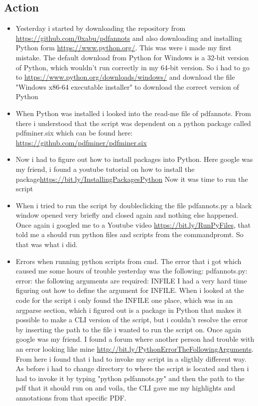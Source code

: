 \documentclass{article}
\begin{document}
\subsection{Action}
\begin{itemize}
    \item Yesterday i started by downloading the repository from \url{https://github.com/0xabu/pdfannots} and also downloading and installing Python form \url{https://www.python.org/}. This was were i made my first mistake. The default download from Python for Windows is a 32-bit version of Python, which wouldn't run correctly in my 64-bit version. So i had to go to \url{https://www.python.org/downloads/windows/} and download the file  "Windows x86-64 executable installer" to download the correct version of Python
    \item When Python was installed i looked into the read-me file of pdfannots. From there i understood that the script was dependent on a python package called pdfminer.six which can be found here: \url{https://github.com/pdfminer/pdfminer.six}
    \item Now i had to figure out how to install packages into Python. Here google was my friend, i found a youtube tutorial on how to install the package\url{https://bit.ly/InstallingPackagesPython} Now it was time to run the script
    \item When i tried to run the script by doubleclicking the file pdfannots.py a black window opened very briefly and closed again and nothing else happened. Once again i googled me to a Youtube video \url{https://bit.ly/RunPyFiles}, that told me a should run python files and scripts from the commandpromt. So that was what i did. 
    \item Errors when running python scripts from cmd. The error that i got which caused me some hours of trouble yesterday was the following: pdfannots.py: error: the following arguments are required: INFILE
    I had a very hard time figuring out how to  define the argument for INFILE. When i looked at the code for the script i only found the INFILE one place, which was in an argparse section, which i figured out is a package in Python that makes it possible to make a CLI version of the script, but i couldn't resolve the error by inserting the path to the file i wanted to run the script on. Once again google was my friend. I found a forum where another person had trouble with an error looking like mine \url{http://bit.ly/PythonErrorTheFollowingArguments}. From here i found that i had to invoke my script in a sligthly different way. As before i had to change directory to where the script is located and then i had to invoke it by typing "python pdfannots.py" and then the path to the pdf that it should run on and voila, the CLI gave me my highlights and annotations from that specific PDF.
\end{itemize}{}
\end{document}
